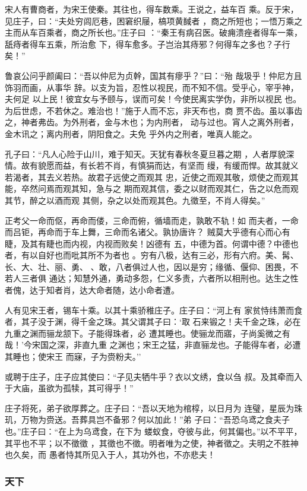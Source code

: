 \documentclass[]{article}
\begin{document}
宋人有曹商者，为宋王使秦。其往也，得车数乘。王说之，益车百
乘。反于宋，见庄子，曰：``夫处穷闾厄巷，困窘织屦，槁项黄馘者
，商之所短也；一悟万乘之主而从车百乘者，商之所长也。''庄子曰
：``秦王有病召医。破痈溃痤者得车一乘，舐痔者得车五乘，所治愈
下，得车愈多。子岂治其痔邪？何得车之多也？子行矣！''

鲁哀公问乎颜阖曰：``吾以仲尼为贞幹，国其有瘳乎？''曰：``殆
哉圾乎！仲尼方且饰羽而画，从事华
辞。以支为旨，忍性以视民，而不知不信。受乎心，宰乎神，夫何足
以上民！彼宜女与予颐与，误而可矣！今使民离实学伪，非所以视民
也。为后世虑，不若休之。难治也！''施于人而不忘，非天布也，商
贾不齿。虽以事齿之，神者弗齿。为外刑者，金与木也；为内刑者，
动与过也。宵人之离外刑者，金木讯之；离内刑者，阴阳食之。夫免
乎外内之刑者，唯真人能之。

孔子曰：``凡人心险于山川，难于知天。天犹有春秋冬夏旦暮之期
，人者厚貌深情。故有貌愿而益，有长若不肖，有慎狷而达，有坚而
缦，有缓而悍。故其就义若渴者，其去义若热。故君子远使之而观其
忠，近使之而观其敬，烦使之而观其能，卒然问焉而观其知，急与之
期而观其信，委之以财而观其仁，告之以危而观其节，醉之以酒而观
其侧，杂之以处而观其色。九徵至，不肖人得矣。''

正考父一命而伛，再命而偻，三命而俯，循墙而走，孰敢不轨！如
而夫者，一命而吕钜，再命而于车上舞，三命而名诸父。孰协唐许？
贼莫大乎德有心而心有睫，及其有睫也而内视，内视而败矣！凶德有
五，中德为首。何谓中德？中德也者，有以自好也而吡其所不为者也
。穷有八极，达有三必，形有六府。美、髯、长、大、壮、丽、勇、
、敢，八者俱过人也，因以是穷；缘循、偃仰、困畏，不若人三者俱
通达；知慧外通，勇动多怨，仁义多责，六者所以相刑也。达生之性
者傀，达于知者肖，达大命者随，达小命者遭。

人有见宋王者，锡车十乘。以其十乘骄稚庄子。庄子曰：``河上有
家贫恃纬萧而食者，其子没于渊，得千金之珠。其父谓其子曰：`取
石来锻之！夫千金之珠，必在九重之渊而骊龙颔下。子能得珠者，必
遭其睡也。使骊龙而寤，子尚奚微之有哉！'今宋国之深，非直九重
之渊也；宋王之猛，非直骊龙也。子能得车者，必遭其睡也；使宋王
而寐，子为赍粉夫。''

或聘于庄子，庄子应其使曰：``子见夫牺牛乎？衣以文绣，食以刍
叔。及其牵而入于大庙，虽欲为孤犊，其可得乎！''

庄子将死，弟子欲厚葬之。庄子曰：``吾以天地为棺椁，以日月为
连璧，星辰为珠玑，万物为赍送。吾葬具岂不备邪？何以加此！''弟
子曰：``吾恐乌鸢之食夫子也。''庄子曰：``在上为乌鸢食，在下为
蝼蚁食，夺彼与此，何其偏也。''以不平平，其平也不平；以不徵徵
，其徵也不徵。明者唯为之使，神者徵之。夫明之不胜神也久矣，而
愚者恃其所见入于人，其功外也，不亦悲夫！

\hypertarget{header-n1012}{%
\subsubsection{天下}\label{header-n1012}}
\end{document}
